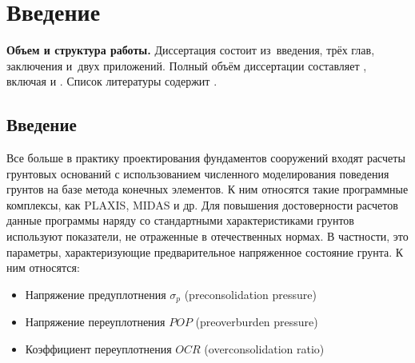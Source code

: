 \chapter*{Введение}                         %

\newcommand{\actuality}{}
\newcommand{\progress}{}
\newcommand{\aim}{{\textbf\aimTXT}}
\newcommand{\tasks}{\textbf{\tasksTXT}}
\newcommand{\novelty}{\textbf{\noveltyTXT}}
\newcommand{\influence}{\textbf{\influenceTXT}}
\newcommand{\methods}{\textbf{\methodsTXT}}
\newcommand{\defpositions}{\textbf{\defpositionsTXT}}
\newcommand{\reliability}{\textbf{\reliabilityTXT}}
\newcommand{\probation}{\textbf{\probationTXT}}
\newcommand{\contribution}{\textbf{\contributionTXT}}
\newcommand{\publications}{\textbf{\publicationsTXT}}


\textbf{Объем и структура работы.} Диссертация состоит из~введения, трёх глав,
заключения и~двух приложений.
%
Полный объём диссертации составляет
, включая
 и
.   Список литературы содержит
.




\section{Введение}
Все больше в практику проектирования фундаментов сооружений входят расчеты грунтовых оснований с использованием численного моделирования поведения грунтов на базе метода конечных элементов. К ним относятся такие программные комплексы, как PLAXIS, MIDAS и др. Для повышения достоверности расчетов данные программы наряду со стандартными характеристиками грунтов используют показатели, не отраженные в отечественных нормах. В частности, это параметры, характеризующие предварительное напряженное состояние грунта. К ним относятся:
\begin{itemize}
    \item Напряжение предуплотнения $\sigma_p$ (preconsolidation pressure)
    \item Напряжение переуплотнения $POP$ (preoverburden pressure)
    \item Коэффициент переуплотнения $OCR$ (overconsolidation ratio)
\end{itemize}


